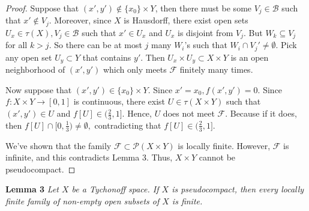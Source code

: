 \documentclass{amsart}
\begin{document}
\begin{proof}
Suppose that $(x',y') \notin \{x_0\}\times Y$, then there must be some $V_j \in \mathcal{B}$ such that $x'\notin V_j$. Moreover, since $X$ is Hausdorff, there exist open sets $U_x\in \tau(X), V_j\in \mathcal{B}$ such that $x'\in U_x$ and $U_x$ is disjoint from $V_j$. But $W_k \subseteq V_j $ for all $k>j.$ So there can be at most $j$ many $W_i$'s such that $W_i\cap V_j'\neq \emptyset.$ Pick any open set $U_y\subset Y$ that contains $y'$. Then $U_x\times U_y \subset X\times Y$ is an open neighborhood of $(x',y')$ which only meets $\mathcal{F}$ finitely many times.


Now suppose that $(x',y') \in \{x_0\}\times Y$. Since $x'=x_0, f(x',y')=0.$ Since $f:X\times Y \rightarrow [0,1]$ is 
continuous, there exist $U\in \tau(X\times Y)$ such that $(x',y')\in U$ and $f[U]\in (\frac{2}{3},1].$ Hence, $U$ does not meet $\mathcal{F}$. Because if it does, then $f[U]\cap [0,\frac{1}{3}) \neq \emptyset,$ contradicting that $f[U]\in (\frac{2}{3},1]$. 

We've shown that the family $\mathcal{F}\subset \mathcal{P}(X\times Y)$ is locally finite. However, $\mathcal{F}$ is infinite, and this contradicts Lemma 3. Thus, $X\times Y$ cannot be pseudocompact. 






\end{proof}




\textbf{Lemma 3}
\emph{Let $X$ be a Tychonoff space. If $X$ is pseudocompact, then every locally finite family of non-empty open subsets of $X$ is finite.}
\end{document}
